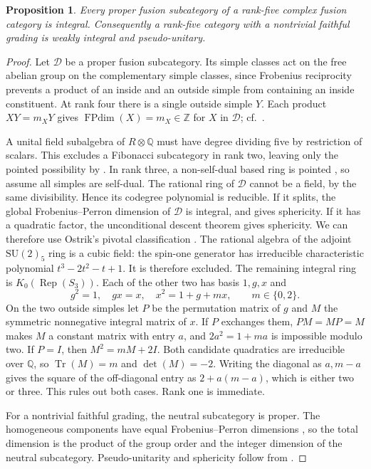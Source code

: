 \documentclass[11pt,a4paper]{article}
\newtheorem{proposition}[theorem]{Proposition}
\numberwithin{equation}{section}
\begin{document}
\begin{proposition}\label{prop:proper-integral}
Every proper fusion subcategory of a rank-five complex fusion category is
integral. Consequently a rank-five category with a nontrivial faithful
grading is weakly integral and pseudo-unitary.
\end{proposition}
\begin{proof}
Let $\mathcal D$ be a proper fusion subcategory. Its simple classes act on
the free abelian group on the complementary simple classes, since Frobenius
reciprocity prevents a product of an inside and an outside simple from
containing an inside constituent. At rank four there is a single outside
simple $Y$. Each product $X Y=m_XY$ gives
$\operatorname{FPdim}(X)=m_X\in\mathbb Z$ for $X$ in $\mathcal D$;
cf.\ \cite[Proposition~3.2]{DCW}.

A unital field subalgebra of $R\otimes\mathbb Q$ must have degree dividing
five by restriction of scalars. This excludes a Fibonacci subcategory in
rank two, leaving only the pointed possibility by \cite{Ostrik2}.
In rank three, a non-self-dual based ring is pointed
\cite[Proposition~3.1]{Ostrik3}, so assume all simples are self-dual.
The rational ring of $\mathcal D$ cannot be a field, by the same
divisibility. Hence its codegree polynomial is reducible. If it
splits, the global Frobenius--Perron dimension of $\mathcal D$ is integral,
and \cite{ENO} gives sphericity. If it has a quadratic factor, the
unconditional descent theorem \cite[Theorem~5.1]{Ostrik3} gives sphericity.
We can therefore use Ostrik's pivotal classification
\cite[Theorem~1.1]{Ostrik3}. The rational algebra of the adjoint
$\mathrm{SU}(2)_5$ ring is a cubic field: the spin-one generator has
irreducible characteristic polynomial $t^3-2t^2-t+1$. It is therefore
excluded. The remaining integral ring is $K_0(\operatorname{Rep}(S_3))$. Each of the other two has basis $1,g,x$ and
\[
 g^2=1,\quad gx=x,\quad x^2=1+g+mx,\qquad m\in\{0,2\}.
\]
On the two outside simples let $P$ be the permutation matrix of $g$ and
$M$ the symmetric nonnegative integral matrix of $x$. If $P$ exchanges
them, $PM=MP=M$ makes $M$ a constant matrix with entry $a$, and
$2a^2=1+ma$ is impossible modulo two. If $P=I$, then
$M^2=mM+2I$. Both candidate quadratics are irreducible over $\mathbb Q$,
so $\operatorname{Tr}(M)=m$ and $\det(M)=-2$. Writing the diagonal as
$a,m-a$ gives the square of the off-diagonal entry as $2+a(m-a)$, which
is either two or three. This rules out both cases. Rank one is immediate.

For a nontrivial faithful grading, the neutral subcategory is proper.
The homogeneous components have equal Frobenius--Perron dimensions
\cite[Proposition~8.20]{ENO}, so the total dimension is the product of the
group order and the integer dimension of the neutral subcategory.
Pseudo-unitarity and sphericity follow from \cite{ENO}.
\end{proof}
\end{document}

